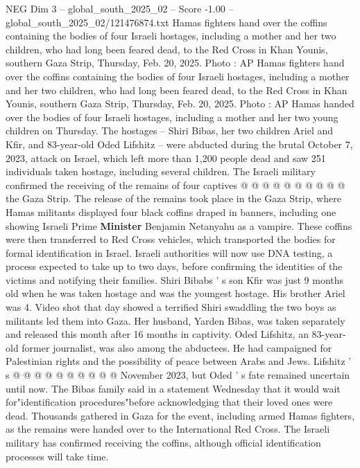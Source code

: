 \begin{textsample}{NEG Dim 3 – global\_south\_2025\_02 – Score -1.00 – global\_south\_2025\_02/121476874.txt}  \label{ex:f3_neg_019}
Hamas fighters hand over the coffins containing the bodies of four Israeli hostages, including a mother and her two children, who had long been feared dead, to the Red Cross in Khan Younis, southern Gaza Strip, Thursday, Feb. 20, 2025.
Photo : AP Hamas fighters hand over the coffins containing the bodies of four Israeli hostages, including a mother and her two children, who had long been feared dead, to the Red Cross in Khan Younis, southern Gaza Strip, Thursday, Feb. 20, 2025.
Photo : AP Hamas handed over the bodies of four Israeli hostages, including a mother and her two young children on Thursday.
The hostages -- Shiri Bibas, her two children Ariel and Kfir, and 83-year-old Oded Lifshitz -- were abducted during the brutal October 7, 2023, attack on Israel, which left more than 1,200 people dead and saw 251 individuals taken hostage, including several children.
The Israeli military confirmed the receiving of the remains of four captives @ @ @ @ @ @ @ @ @ @ the Gaza Strip.
The release of the remains took place in the Gaza Strip, where Hamas militants displayed four black coffins draped in banners, including one showing Israeli Prime \textbf{Minister} Benjamin Netanyahu as a vampire.
These coffins were then transferred to Red Cross vehicles, which transported the bodies for formal identification in Israel.
Israeli authorities will now use DNA testing, a process expected to take up to two days, before confirming the identities of the victims and notifying their families.
Shiri Bibabs ' s son Kfir was just 9 months old when he was taken hostage and was the youngest hostage.
His brother Ariel was 4.
Video shot that day showed a terrified Shiri swaddling the two boys as militants led them into Gaza.
Her husband, Yarden Bibas, was taken separately and released this month after 16 months in captivity.
Oded Lifshitz, an 83-year-old former journalist, was also among the abductees.
He had campaigned for Palestinian rights and the possibility of peace between Arabs and Jews.
Lifshitz ' s @ @ @ @ @ @ @ @ @ @ November 2023, but Oded ' s fate remained uncertain until now.
The Bibas family said in a statement Wednesday that it would wait for"identification procedures"before acknowledging that their loved ones were dead.
Thousands gathered in Gaza for the event, including armed Hamas fighters, as the remains were handed over to the International Red Cross.
The Israeli military has confirmed receiving the coffins, although official identification processes will take time.

\end{textsample}
